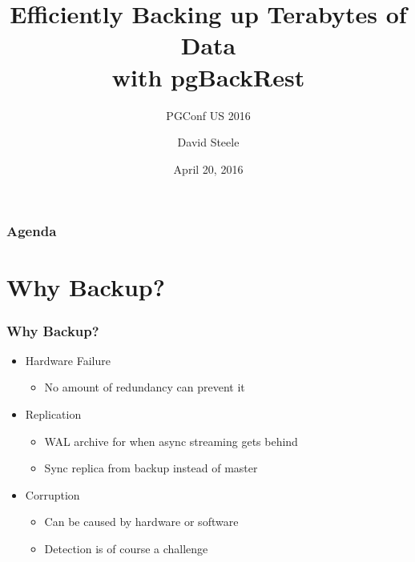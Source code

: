 \documentclass[hyperref={pdfpagelabels=false}]{beamer}
\title{Efficiently Backing up Terabytes of Data\\
       with pgBackRest}
\subtitle{PGConf US 2016}
\author{David Steele}
\institute{Crunchy Data Solutions, Inc.}
\date{April 20, 2016}
\begin{document}
    \begin{frame}
        \titlepage
    \end{frame}

    \begin{frame}
        \frametitle{Agenda}
        \tableofcontents
    \end{frame}

    \section{Why Backup?}

    \begin{frame}
        \frametitle{Why Backup?}

        \begin{itemize}
            \item Hardware Failure

            \begin{itemize}
                \item No amount of redundancy can prevent it
            \end{itemize}

            \item Replication

            \begin{itemize}
                \item WAL archive for when async streaming gets behind
                \item Sync replica from backup instead of master
            \end{itemize}

            \item Corruption

            \begin{itemize}
                \item Can be caused by hardware or software
                \item Detection is of course a challenge
            \end{itemize}
        \end{itemize}
    \end{frame}
\end{document}
